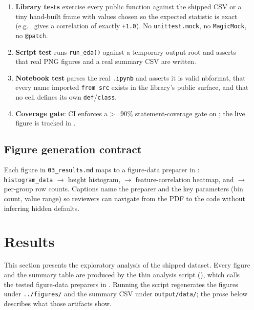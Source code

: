 \documentclass[
  english,
]{article}
\providecommand{\tightlist}{%
  \setlength{\itemsep}{0pt}\setlength{\parskip}{0pt}}
\begin{document}
\begin{enumerate}
\def\labelenumi{\arabic{enumi}.}
\tightlist
\item
  \textbf{Library tests} exercise every public function against the
  shipped CSV or a tiny hand-built frame with values chosen so the
  expected statistic is exact (e.g.~
  gives a correlation of exactly \texttt{+1.0}). No
  \texttt{unittest.mock}, no \texttt{MagicMock}, no \texttt{@patch}.
\item
  \textbf{Script test} runs \texttt{run\_eda()} against a temporary
  output root and asserts that real PNG figures and a real summary CSV
  are written.
\item
  \textbf{Notebook test} parses the real \texttt{.ipynb} and asserts it
  is valid nbformat, that every name imported \texttt{from\ src} exists
  in the library's public surface, and that no cell defines its own
  \texttt{def}/\texttt{class}.
\item
  \textbf{Coverage gate}: CI enforces a \texorpdfstring{\textgreater{}=}{>=}90\% statement-coverage gate on
  ; the live
  figure is tracked in
  \href{../../../../docs/_generated/COUNTS.md}{}.
\end{enumerate}

\subsection{Figure generation
contract}\label{figure-generation-contract}

Each figure in \texttt{03\_results.md} maps to a figure-data preparer in
: \texttt{histogram\_data} \texorpdfstring{\ensuremath{\to}}{->} height
histogram,  \texorpdfstring{\ensuremath{\to}}{->} feature-correlation
heatmap, and  \texorpdfstring{\ensuremath{\to}}{->} per-group row counts.
Captions name the preparer and the key parameters (bin count, value
range) so reviewers can navigate from the PDF to the code without
inferring hidden defaults.

\newpage

\section{Results}\label{sec:results}

This section presents the exploratory analysis of the shipped dataset.
Every figure and the summary table are produced by the thin analysis
script
(\href{https://github.com/docxology/template/blob/main/projects/templates/template_eda_notebook/scripts/eda_analysis.py}{}),
which calls the tested figure-data preparers in
. Running the script regenerates the figures
under \texttt{../figures/} and the summary CSV under
\texttt{output/data/}; the prose below describes what those artifacts
show.
\end{document}
